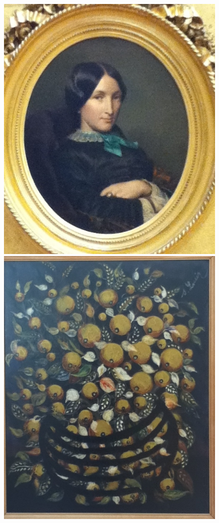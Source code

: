 \begin{figure}[htb]
   \begin{minipage}[c]{.3\linewidth}
      \includegraphics[width=\linewidth]{figures/15R-3.JPG}
   \end{minipage} \hfill
   \begin{minipage}[c]{.3\linewidth}
      \includegraphics[width=\linewidth]{figures/34C-7.JPG}

\end{minipage}
\end{figure}
